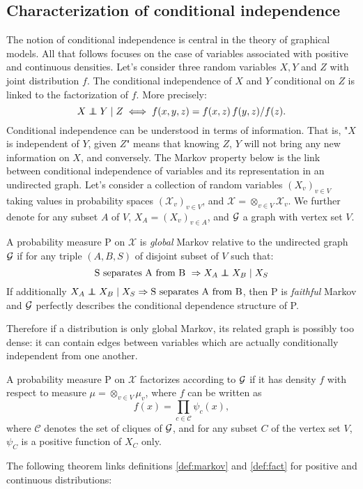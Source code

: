 \subsection{Characterization of conditional independence}
The notion of conditional independence is central in the theory of graphical models. All that follows focuses on the case of variables associated with positive and continuous densities. Let's consider three random variables $X,Y$ and $Z$ with joint distribution $f$. The conditional independence of $X$ and $Y$ conditional on $Z$ is linked to the factorization of $f$. More precisely: 
$$X \independent Y \mid Z \iff f(x,y,z) = f(x,z) \, f(y,z)/f(z). $$
Conditional independence can be understood in terms of information. That is, "$X$ is independent of $Y$, given $Z$" means that knowing $Z$, $Y$ will not bring any new information on $X$, and conversely. The Markov property below is the link between conditional independence of variables and its representation in an undirected graph. Let's consider a collection of random variables $(X_v)_{v\in V}$ taking values in probability spaces $(\mathcal{X}_v)_{v\in V}$, and $\mathcal{X}=\otimes_{v\in V} \mathcal{X}_v$. We further denote for any subset $A$ of $V$, $X_A=(X_v)_{v\in A}$, and $\mathcal{G}$ a graph with vertex set $V$. 

\begin{definition}\label{def:markov}
A probability measure P on $\mathcal{X}$ is \textit{global} Markov relative to the undirected graph $\mathcal{G}$ if for any triple $(A, B, S)$ of disjoint subset of $V$ such that:
 $$ \text{S separates A from B } \Rightarrow X_A\independent X_B \mid X_S$$
 If additionally $X_A\independent X_B \mid X_S \Rightarrow \text{S separates A from B}  $, then P is \textit{faithful} Markov and $\mathcal{G}$ perfectly describes the conditional dependence structure of P.
\end{definition}
Therefore if a distribution is only global Markov, its related graph is possibly too dense: it can contain edges between variables which are actually conditionally independent from one another. 
\begin{definition}[Factorization]\label{def:fact}
A probability measure P on $\mathcal{X}$ factorizes according to $\mathcal{G}$ if it has density $f$ with respect to measure $\mu = \otimes_{v\in V} \mu_v$, where $f$ can be written as
$$f(x) = \prod_{c\in \mathcal{C} }\psi_c(x),$$
where $\mathcal{C}$ denotes the set of cliques of $\mathcal{G}$, and for any subset $C$ of the vertex set $V$, $\psi_C$ is a positive function of $X_C$ only.
\end{definition}
The following theorem links definitions \ref{def:markov} and \ref{def:fact} for positive and continuous distributions:

